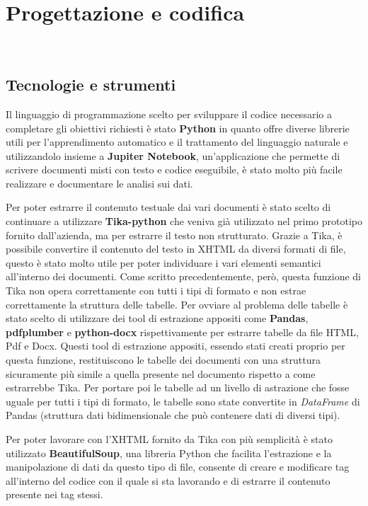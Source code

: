 \chapter{Progettazione e codifica}
\label{cap:progettazione-codifica}

\\

\section{Tecnologie e strumenti}
\label{sec:tecnologie-strumenti}

Il linguaggio di programmazione scelto per sviluppare il codice necessario a completare gli obiettivi richiesti è stato \textbf{Python} in quanto offre diverse librerie utili per l'apprendimento automatico e il trattamento del linguaggio naturale e utilizzandolo insieme a \textbf{Jupiter Notebook}, un'applicazione che permette di scrivere documenti misti con testo e codice eseguibile, è stato molto più facile realizzare e documentare le analisi sui dati.

\noindent Per poter estrarre il contenuto testuale dai vari documenti è stato scelto di continuare a utilizzare \textbf{Tika-python} che veniva già utilizzato nel primo prototipo fornito dall'azienda, ma per estrarre il testo non strutturato.
Grazie a Tika, è possibile convertire il contenuto del testo in XHTML da diversi formati di file, questo è stato molto utile per poter individuare i vari elementi semantici all'interno dei documenti.
Come scritto precedentemente, però, questa funzione di Tika non opera correttamente con tutti i tipi di formato e non estrae correttamente la struttura delle tabelle.
Per ovviare al problema delle tabelle è stato scelto di utilizzare dei tool di estrazione appositi come \textbf{Pandas}, \textbf{pdfplumber} e \textbf{python-docx} rispettivamente per estrarre tabelle da file HTML, Pdf e Docx.
Questi tool di estrazione appositi, essendo stati creati proprio per questa funzione, restituiscono le tabelle dei documenti con una struttura sicuramente più simile a quella presente nel documento rispetto a come estrarrebbe Tika.
Per portare poi le tabelle ad un livello di astrazione che fosse uguale per tutti i tipi di formato, le tabelle sono state convertite in \emph{DataFrame} di Pandas (struttura dati bidimensionale che può contenere dati di diversi tipi).

Per poter lavorare con l'XHTML fornito da Tika con più semplicità è stato utilizzato \textbf{BeautifulSoup}, una libreria Python che facilita l'estrazione e la manipolazione di dati da questo tipo di file, consente di creare e modificare tag all'interno del codice con il quale si sta lavorando e di estrarre il contenuto presente nei tag stessi.

